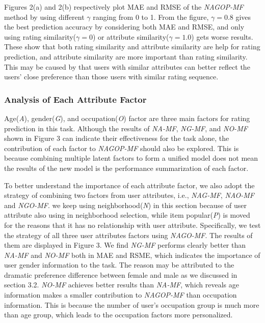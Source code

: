 \documentclass{llncs}
\begin{document}
	Figures 2(a) and 2(b) respectively plot MAE and RMSE of the
	\emph{NAGOP-MF} method by using different $\gamma$ ranging from 0 to 1.
	From the figure, $\gamma= 0.8$ gives the best prediction accuracy by considering both MAE and RMSE,
	and only using rating similarity($\gamma= 0$) or attribute similarity($\gamma= 1.0$) gets worse results.
	These show that both rating similarity and attribute similarity are help for rating prediction, and
	attribute similarity are more important than rating similarity. This may be caused by that
	users with similar attributes can better reflect the users' close preference than those users with similar rating sequence.
	
	\subsubsection{Analysis of Each Attribute Factor}
	
	Age(\emph{A}), gender(\emph{G}), and occupation(\emph{O}) factor are three main factors for rating prediction in this task. Although the results of \emph{NA-MF},
	\emph{NG-MF}, and \emph{NO-MF} shown in Figure 3 can indicate their effectiveness for the task alone, the contribution
	of each factor to \emph{NAGOP-MF} should also be explored. This is
	because combining multiple latent factors to form a unified model does not mean the results of the new model is the
	performance summarization of each factor.
	
	To better understand the importance of each attribute factor, we also adopt the strategy of combining two factors from user attributes,
	i.e., \emph{NAG-MF}, \emph{NAO-MF} and \emph{NGO-MF}. we keep using neighborhood(\emph{N}) in this section because of user attribute also
	using in neighborhood selection, while item popular(\emph{P}) is moved for the reasons that it has no relationship with user attribute.
	Specifically, we test the strategy of all three user attributes factors using \emph{NAGO-MF}. The results of them are displayed
	in Figure 3. We find \emph{NG-MF} performs clearly better than \emph{NA-MF} and \emph{NO-MF} both in MAE and RSME, which indicates the importance of
	user gender information to the task. The reason may be attributed to the dramatic preference difference between female and male
	as we discussed in section 3.2.
	\emph{NO-MF} achieves better results than \emph{NA-MF}, which reveals age information makes a smaller contribution to \emph{NAGOP-MF} than
	occupation information. This is because the number of user's occupation group is much more than age group, which leads to the
	occupation factors more personalized.
	
\end{document}
